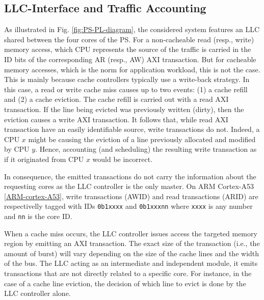 

\subsection{LLC-\schim Interface and Traffic Accounting}
As illustrated in Fig. \ref{fig:PS-PL-diagram}, the considered system
features an LLC shared between the four cores of the PS. For a
non-cacheable read (resp., write) memory access, which CPU represents
the source of the traffic is carried in the ID bits of the
corresponding AR (resp., AW) AXI transaction. But for cacheable memory
accesses, which is the norm for application workload, this is not the
case. This is mainly because cache controllers typically use a
write-back strategy. In this case, a read or write cache miss causes
up to two events: (1) a cache refill and (2) a cache eviction. The
cache refill is carried out with a read AXI transaction. If the line
being evicted was previously written (dirty), then the eviction causes
a write AXI transaction. It follows that, while read AXI transaction
have an easily identifiable source, write transactions do not. Indeed,
a CPU $x$ might be causing the eviction of a line previously allocated
and modified by CPU $y$. Hence, accounting (and scheduling) the
resulting write transaction as if it originated from CPU $x$ would be
incorrect.

In consequence, the emitted transactions do not carry the information
about the requesting cores as the LLC controller is the only
master. On ARM Cortex-A53 \ref{ARM-cortex-A53}, write transactions
(AWID) and read transactions (ARID) are respectivelly tagged with IDs
\verb|0b1xxxx| and \verb|0b1xxxnn| where \verb|xxxx| is any number and
\verb|nn| is the core ID.

When a cache miss occurs, the LLC controller issues access the
targeted memory region by emitting an AXI transaction. The exact size
of the transaction (i.e., the amount of burst) will vary depending on
the size of the cache lines and the width of the bus. The LLC acting
as an intermediate and independent module, it emits transactions that
are not directly related to a specific core. For instance, in the case
of a cache line eviction, the decision of which line to evict is done
by the LLC controller alone.


